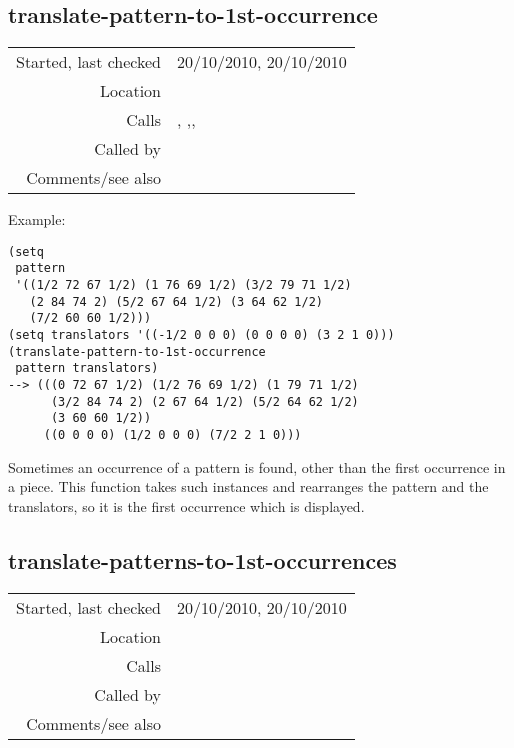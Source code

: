 \subsection*{translate-pattern-to-1st-occurrence}\label{fun:translate-pattern-to-1st-occurrence}

\vspace{0.3cm}
\begin{tabular}{r|p{8cm}}
Started, last checked & 20/10/2010, 20/10/2010 \\
Location & \nameref{sec:pattern-inheritance-preliminaries} \\
Calls & \nameref{fun:constant-vector}, \nameref{fun:multiply-list-by-constant},\newline \nameref{fun:translation}, \nameref{fun:vector<vector-t-or-nil} \\
Called by & \nameref{fun:translate-patterns-to-1st-occurrences} \\
Comments/see also & 
\end{tabular}

\vspace{0.5cm}
\noindent Example:
\begin{verbatim}
(setq
 pattern
 '((1/2 72 67 1/2) (1 76 69 1/2) (3/2 79 71 1/2)
   (2 84 74 2) (5/2 67 64 1/2) (3 64 62 1/2)
   (7/2 60 60 1/2)))
(setq translators '((-1/2 0 0 0) (0 0 0 0) (3 2 1 0)))
(translate-pattern-to-1st-occurrence
 pattern translators)
--> (((0 72 67 1/2) (1/2 76 69 1/2) (1 79 71 1/2)
      (3/2 84 74 2) (2 67 64 1/2) (5/2 64 62 1/2)
      (3 60 60 1/2))
     ((0 0 0 0) (1/2 0 0 0) (7/2 2 1 0)))
\end{verbatim}

\noindent Sometimes an occurrence of a pattern is
found, other than the first occurrence in a piece.
This function takes such instances and rearranges the
pattern and the translators, so it is the first
occurrence which is displayed.


\subsection*{translate-patterns-to-1st-occurrences}\label{fun:translate-patterns-to-1st-occurrences}

\vspace{0.3cm}
\begin{tabular}{r|p{8cm}}
Started, last checked & 20/10/2010, 20/10/2010 \\
Location & \nameref{sec:pattern-inheritance-preliminaries} \\
Calls & \nameref{fun:translate-pattern-to-1st-occurrence} \\
Called by & \nameref{fun:prepare-for-pattern-inheritance} \\
Comments/see also & 
\end{tabular}

